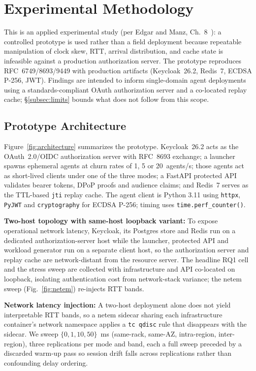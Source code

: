 \documentclass[conference]{IEEEtran}
\begin{document}
\section{Experimental Methodology}
\label{sec:method}

This is an applied experimental study (per Edgar and Manz, Ch.~8~\cite{edgar2017research}): a controlled prototype is used rather than a field deployment because repeatable manipulation of clock skew, RTT, arrival distribution, and cache state is infeasible against a production authorization server. The prototype reproduces RFC~6749/8693/9449 with production artifacts (Keycloak~26.2, Redis~7, ECDSA P-256, JWT). Findings are intended to inform single-domain agent deployments using a standards-compliant OAuth authorization server and a co-located replay cache; \S\ref{subsec:limits} bounds what does not follow from this scope.

\subsection{Prototype Architecture}
\label{subsec:prototype}

Figure~\ref{fig:architecture} summarizes the prototype. Keycloak~26.2 acts as the OAuth~2.0/OIDC authorization server with RFC~8693 exchange; a launcher spawns ephemeral agents at churn rates of 1, 5 or 20~agents/s; those agents act as short-lived clients under one of the three modes; a FastAPI protected API validates bearer tokens, DPoP proofs and audience claims; and Redis~7 serves as the TTL-based \texttt{jti} replay cache. The agent client is Python 3.11 using \texttt{httpx}, \texttt{PyJWT} and \texttt{cryptography} for ECDSA P-256; timing uses \texttt{time.perf\_counter()}.

\textbf{Two-host topology with same-host loopback variant:}
To expose operational network latency, Keycloak, its Postgres store and Redis run on a dedicated authorization-server host while the launcher, protected API and workload generator run on a separate client host, so the authorization server and replay cache are network-distant from the resource server. The headline RQ1 cell and the stress sweep are collected with infrastructure and API co-located on loopback, isolating authentication cost from network-stack variance; the netem sweep (Fig.~\ref{fig:netem}) re-injects RTT bands.

\textbf{Network latency injection:}
A two-host deployment alone does not yield interpretable RTT bands, so a netem sidecar sharing each infrastructure container's network namespace applies a \texttt{tc qdisc} rule that disappears with the sidecar. We sweep $\{0, 1, 10, 50\}$~ms (same-rack, same-AZ, intra-region, inter-region), three replications per mode and band, each a full sweep preceded by a discarded warm-up pass so session drift falls across replications rather than confounding delay ordering.
\end{document}
